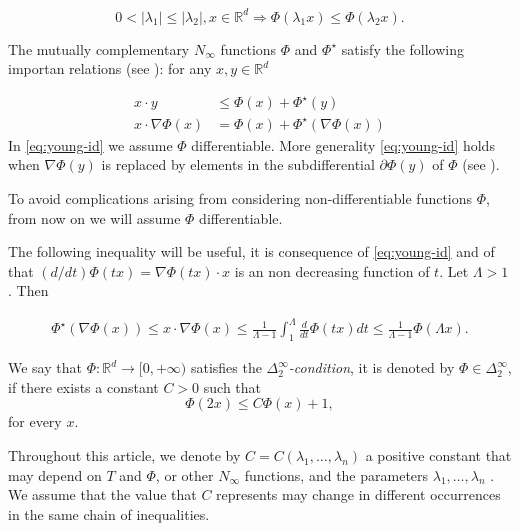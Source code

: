 \documentclass[twoside]{article}
\theoremstyle{remark}
\newcommand{\rr}{\mathbb{R}}
\renewcommand{\leq}{\leqslant}
\begin{document}
\begin{equation}\label{eq:escalar_ine_2} 0<|\lambda_1|\leq |\lambda_2|, x\in\rr^d \Rightarrow \Phi(\lambda_1 x)\leq\Phi(\lambda_2 x).\end{equation} 

The mutually complementary $N_{\infty}$ functions $\Phi$ and $\Phi^{\star}$ satisfy the following importan relations (see \cite{clarke2013functional}): for any $x,y\in\rr^d$

\begin{align}
  x\cdot y&\leq \Phi(x)+\Phi^{\star}(y)\label{eq:young-ine}\\
  x\cdot \nabla\Phi(x)&= \Phi(x)+\Phi^{\star}(\nabla \Phi (x))\label{eq:young-id}
\end{align}
In \eqref{eq:young-id} we assume $\Phi$ differentiable. More generality \eqref{eq:young-id} holds when $\nabla \Phi (y)$ is replaced by elements in the subdifferential $\partial\Phi(y)$ of $\Phi$ (see \cite[Ex. 4.27]{clarke2013functional}). 

To avoid complications arising from considering non-differentiable functions $\Phi$, from now on we will assume $\Phi$ differentiable. 


The following inequality  will be useful, it is consequence of \eqref{eq:young-id} and of that $(d/dt)\Phi(tx)=\nabla\Phi(tx)\cdot x$ is an non decreasing function of $t$. Let $\Lambda>1$. Then


\begin{equation} \label{eq:ine-psi-phi'}
  \begin{split}
     \Phi^{\star}(\nabla \Phi (x))\leq  x\cdot \nabla\Phi(x) \leq\frac{1}{\Lambda-1}\int_1^{\Lambda} \frac{d}{dt}\Phi(tx)dt \leq\frac{1}{\Lambda-1}\Phi(\Lambda x). \end{split}
\end{equation}

We say that  $\Phi:\mathbb{R}^d\rightarrow [0,+\infty)$ satisfies the  \emph{$\Delta_2^{\infty}$-condition}, it is denoted by $\Phi \in \Delta_2^{\infty}$,
if there exists a  constant $C>0$  such that
\begin{equation}\label{delta2defi}\Phi(2x)\leq C \Phi(x)+1,
\end{equation}
for every $x$.  

Throughout this article, we denote by $C=C(\lambda_1,\ldots,\lambda_n)$ a positive constant that may depend on $T$ and $\Phi$,  or other $N_{\infty}$ functions, and the parameters $\lambda_1,\ldots,\lambda_n$ . We assume that the value that $C$ represents may change in 
different occurrences in the same chain of inequalities. 
\end{document}
